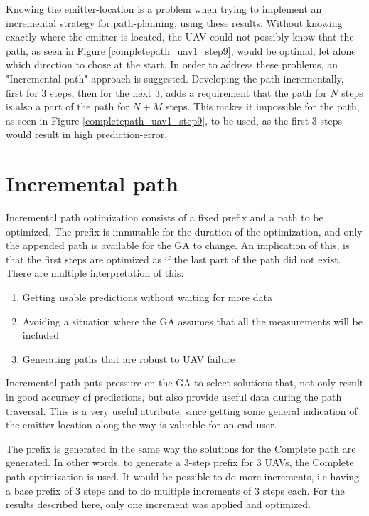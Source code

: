 \documentclass[10pt,a4paper]{book}
\begin{document}
Knowing the emitter-location is a problem when trying to implement an incremental strategy for path-planning, using these results. Without knowing exactly where the emitter is located, the \gls{UAV} could not possibly know that the path, as seen in Figure \ref{completepath_uav1_step9}, would be optimal, let alone which direction to chose at the start. In order to address these problems, an "Incremental path" approach is suggested. Developing the path incrementally, first for 3 steps, then for the next 3, adds a requirement that the path for $N$ steps is also a part of the path for $N+M$ steps. This makes it impossible for the path, as seen in Figure \ref{completepath_uav1_step9}, to be used, as the first 3 steps would result in high prediction-error.




\newpage

\section{Incremental path}

\label{Res_IP}


Incremental path optimization consists of a fixed prefix and a path to be optimized. The prefix is immutable for the duration of the optimization, and only the appended path is available for the \gls{GA} to change. An implication of this, is that the first steps are optimized as if the last part of the path did not exist. There are multiple interpretation of this:

\begin{enumerate}

\item Getting usable predictions without waiting for more data
\item Avoiding a situation where the \gls{GA} assumes that all the measurements will be included
\item Generating paths that are robust to \gls{UAV} failure
\end{enumerate}

Incremental path puts pressure on the \gls{GA} to select solutions that, not only result in good accuracy of predictions, but also provide useful data during the path traversal. This is a very useful attribute, since getting some general indication of the emitter-location along the way is valuable for an end user.

The prefix is generated in the same way the solutions for the Complete path are generated. In other words, to generate a 3-step prefix for 3 \glspl{UAV}, the Complete path optimization is used. It would be possible to do more increments, i.e having a base prefix of 3 steps and to do multiple increments of 3 steps each. For the results described here, only one increment was applied and optimized.
\end{document}
